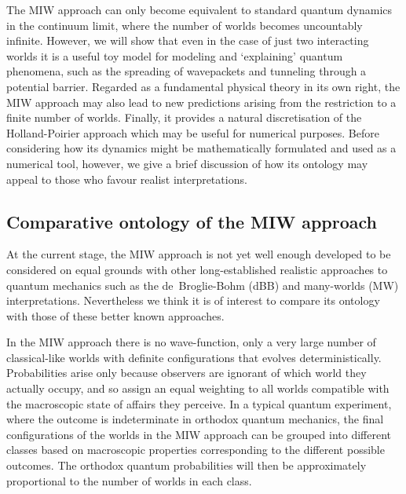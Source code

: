 \documentclass[twocolumn,aps,pra,amsmath,amssymb,superscriptaddress]{revtex4}
\renewcommand{\(}{\left(}
\renewcommand{\)}{\right)}
\newcommand{\red}{\color{red}}
\newcommand{\blk}{\color{black}}
\newcommand{\grn}{\color{ngreen}}
\renewcommand\grn{\blk}
\renewcommand\red{\blk}
\begin{document}
The MIW approach \blk can only become \blk equivalent to standard quantum
dynamics in the continuum limit, where the number of worlds becomes \blk
uncountably \blk infinite.  However, we will show that even  in  the case of just two
interacting worlds \blk it \blk is a useful toy model for modeling and
`explaining' quantum phenomena, such as the spreading of  wavepackets  and
tunneling through a potential barrier. \blk
Regarded as a fundamental physical theory
in its own right, the MIW approach may also lead to new predictions arising from
the restriction to a finite number of worlds. \red Finally, \blk it provides a natural
discretisation of the Holland-Poirier approach which may be useful for numerical
purposes. \red Before considering how its dynamics might be mathematically 
formulated and used as a numerical tool, however, we give a brief discussion of how 
its ontology may appeal to those who favour realist interpretations. \blk 


\subsection{Comparative ontology of the MIW approach} 

\grn At the current stage, the MIW approach is \red not yet well enough 
developed to be considered on equal grounds with other long-established 
realistic approaches to quantum mechanics such as  the de~Broglie-Bohm (dBB) and
many-worlds (MW) interpretations. Nevertheless we think it is  of interest \red to compare its ontology with those of these better known approaches. 
\blk 

\blk In the MIW approach \red there is no wave-function, only a very large number 
of classical-like worlds with definite configurations \blk that
evolves deterministically. Probabilities arise only because observers are
ignorant of which world they actually occupy, and so assign an equal weighting
\blk to all worlds compatible with the  macroscopic state of affairs they
perceive. In a typical quantum experiment, where the outcome is indeterminate in
orthodox quantum mechanics, the final configurations of the worlds in the MIW
approach can be grouped into different classes based on macroscopic properties
corresponding to the different possible outcomes. The orthodox quantum
probabilities will then be approximately proportional to the number of worlds in
each class. \blk 
\end{document}
